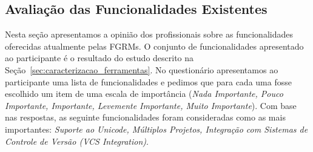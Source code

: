 \subsection{Avaliação das Funcionalidades Existentes}\label{sub:avaliação_das_funcionalidades_existentes}

Nesta seção apresentamos a opinião dos profissionais sobre as funcionalidades
oferecidas atualmente pelas FGRMs\@. O conjunto de funcionalidades apresentado
ao participante é o resultado do estudo descrito na
Seção~\ref{sec:caracterizacao_ferramentas}. No questionário apresentamos ao
participante uma lista de funcionalidades e pedimos que para cada uma fosse
escolhido um item de uma escala de importância (\textit{Nada Importante, Pouco
    Importante, Importante, Levemente Importante, Muito Importante}). Com base
nas respostas, as seguinte funcionalidades foram consideradas como as mais
importantes: \textit{Suporte ao Unicode, Múltiplos Projetos, Integração com
    Sistemas de Controle de Versão (VCS Integration)}.

